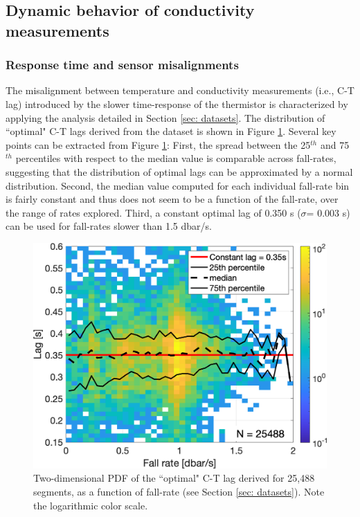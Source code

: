 \documentclass{ametsocV6.1}
\begin{document}
\subsection{Dynamic behavior of conductivity measurements}
\subsubsection{Response time and sensor misalignments}
The misalignment between temperature and conductivity measurements (i.e., C-T lag) introduced by the slower time-response of the thermistor is characterized by applying the analysis detailed in Section \ref{sec: datasets}.  The distribution of ``optimal" C-T lags derived from the dataset is shown in Figure \ref{fig: CT_lag}.  Several key points can be extracted from Figure \ref{fig: CT_lag}: First,  the spread between the 25$^{th}$ and 75$^{th}$ percentiles with respect to the median value is comparable across fall-rates,  suggesting that the distribution of optimal lags can be approximated by a normal distribution.  Second,  the median value computed for each individual fall-rate bin is fairly constant and thus does not seem to be a function of the fall-rate,  over the range of rates explored.  Third,  a constant optimal lag of 0.350 s ($\sigma$= 0.003 s) can be used for fall-rates slower than 1.5 dbar/s.

\begin{figure}[t]
	\centering
	\includegraphics[width=.7\linewidth]{Fig7_RBRargo_CTlag_2DPDF}
\caption{Two-dimensional PDF of the ``optimal" C-T lag derived for 25,488 segments,  as a function of fall-rate (see Section \ref{sec: datasets}).  Note the logarithmic color scale.}
	\label{fig: CT_lag}
\end{figure}
\end{document}
